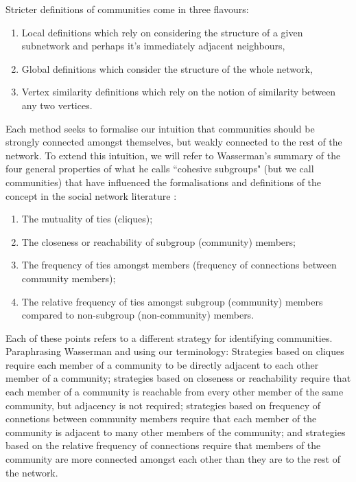 Stricter definitions of communities come in three flavours:

\begin{enumerate}
    \item Local definitions which rely on considering the structure of a given subnetwork and perhaps it's immediately adjacent neighbours,
    \item Global definitions which consider the structure of the whole network,
    \item Vertex similarity definitions which rely on the notion of similarity between any two vertices.
\end{enumerate}

Each method seeks to formalise our intuition that communities should be strongly connected amongst themselves, but weakly connected to the rest of the network. To extend this intuition, we will refer to Wasserman's summary of the four general properties of what he calls ``cohesive subgroups" (but we call communities) that have influenced the formalisations and definitions of the concept in the social network literature \cite[p. 251-252]{wasserman_faust_1994}:

\begin{enumerate}
    \item The mutuality of ties (cliques);
    \item The closeness or reachability of subgroup (community) members;
    \item The frequency of ties amongst members (frequency of connections between community members);
    \item The relative frequency of ties amongst subgroup (community) members compared to non-subgroup (non-community) members.
\end{enumerate}

Each of these points refers to a different strategy for identifying communities. Paraphrasing Wasserman and using our terminology: Strategies based on cliques require each member of a community to be directly adjacent to each other member of a community; strategies based on closeness or reachability require that each member of a community is reachable from every other member of the same community, but adjacency is not required; strategies based on frequency of connetions between community members require that each member of the community is adjacent to many other members of the community; and strategies based on the relative frequency of connections require that members of the community are more connected amongst each other than they are to the rest of the network.

